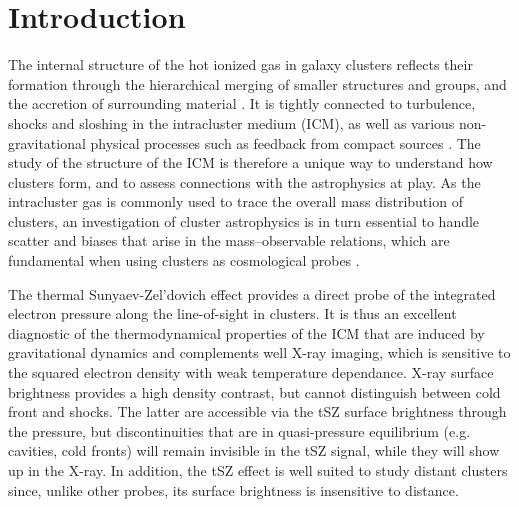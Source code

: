 \documentclass[twocolumn,traditabstract]{aa}
\begin{document}
\section{Introduction}
The internal structure of the hot ionized gas in galaxy clusters reflects their formation through the hierarchical merging of smaller structures and groups, and the accretion of surrounding material \citep[e.g.][and references therein]{Kravtsov2012}. It is tightly connected to turbulence, shocks and sloshing \citep[e.g.][]{Markevitch2007} in the intracluster medium (ICM), as well as various non-gravitational physical processes such as feedback from compact sources \citep[e.g.][]{Fabian2012}. The study of the structure of the ICM is therefore a unique way to understand how clusters form, and to assess connections with the astrophysics at play. As the intracluster gas is commonly used to trace the overall mass distribution of clusters, an investigation of cluster astrophysics is in turn essential to handle scatter and biases that arise in the mass--observable relations, which are fundamental when using clusters as cosmological probes \citep[see, e.g.][for a review]{Allen2011}.

The thermal Sunyaev-Zel'dovich \citep[tSZ,][]{Sunyaev1972} effect provides a direct probe of the integrated electron pressure along the line-of-sight in clusters. It is thus an excellent diagnostic of the thermodynamical properties of the ICM that are induced by gravitational dynamics and complements well X-ray imaging, which is sensitive to the squared electron density with weak temperature dependance. X-ray surface brightness provides a high density contrast, but cannot distinguish between cold front and shocks. The latter are accessible via the tSZ surface brightness through the pressure, but discontinuities that are in quasi-pressure equilibrium (e.g. cavities, cold fronts) will remain invisible in the tSZ signal, while they will show up in the X-ray. In addition, the tSZ effect is well suited to study distant clusters since, unlike other probes, its surface brightness is insensitive to distance.
\end{document}
